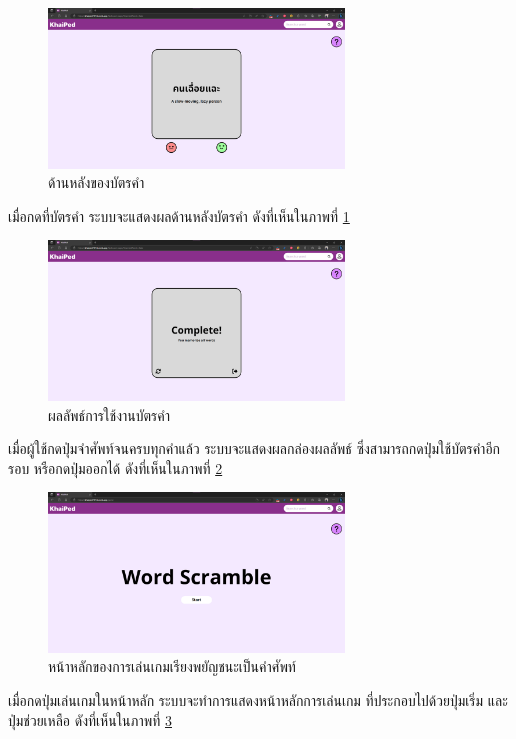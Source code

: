 \documentclass[12pt,oneside,openright,a4paper]{cpe-thai-project}
\begin{document}
\pagebreak
\begin{figure}[!h]\centering
	\includegraphics[width=0.7\textwidth, keepaspectratio=true]{image/chap4/UI/flashcard/back.png}
	\caption{{ด้านหลังของบัตรคำ}}\label{fig:chap4UIFlashBack}
\end{figure}
\hspace{1cm}
เมื่อกดที่บัตรคำ ระบบจะแสดงผลด้านหลังบัตรคำ ดังที่เห็นในภาพที่ \ref{fig:chap4UIFlashBack}

\begin{figure}[!h]\centering
	\includegraphics[width=0.7\textwidth, keepaspectratio=true]{image/chap4/UI/flashcard/result.png}
	\caption{{ผลลัพธ์การใช้งานบัตรคำ}}\label{fig:chap4UIFlashResult}
\end{figure}
\hspace{1cm}
เมื่อผู้ใช้กดปุ่มจำศัพท์จนครบทุกคำแล้ว ระบบจะแสดงผลกล่องผลลัพธ์ ซึ่งสามารถกดปุ่มใช้บัตรคำอีกรอบ หรือกดปุ่มออกได้
ดังที่เห็นในภาพที่ \ref{fig:chap4UIFlashResult}

\pagebreak
\begin{figure}[!h]\centering
	\includegraphics[width=0.7\textwidth, keepaspectratio=true]{image/chap4/UI/game/game.png}
	\caption{{หน้าหลักของการเล่นเกมเรียงพยัญชนะเป็นคำศัพท์}}\label{fig:chap4UIGame}
\end{figure}
\hspace{1cm}
เมื่อกดปุ่มเล่นเกมในหน้าหลัก ระบบจะทำการแสดงหน้าหลักการเล่นเกม ที่ประกอบไปด้วยปุ่มเริ่ม และปุ่มช่วยเหลือ
ดังที่เห็นในภาพที่ \ref{fig:chap4UIGame}
\end{document}
